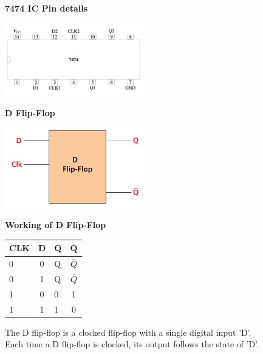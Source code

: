 \documentclass[10pt,a4paper]{report}
\begin{document}
\begin{multicols}{2}
   \vspace{2mm}\textbf{7474 IC Pin details}
 \begin{center}
 \includegraphics[width=0.45\textwidth]{ic.png} 
 \end{center}\vspace{5mm}
  \vspace{2mm}\textbf{D Flip-Flop}
 \begin{center}
 \includegraphics[width=0.45\textwidth]{dff.jpg} 
 \end{center}\vspace{1cm}
 \textbf{Working of D Flip-Flop}

  \setlength{\arrayrulewidth}{0.5mm} \begin{center}
      

  \setlength{\tabcolsep}{25pt}
  \renewcommand{\arraystretch}{1.3}
  \begin{tabular}{|l|c|l|c|}
  \hline 
  \textbf{CLK} & \textbf{D} & \textbf{Q}  & \textbf{$\overline{\textbf{Q}}$}\\
  \hline
    0 & 0 & Q & $\overline{Q}$\\
    0 & 1 & Q & $\overline{Q}$ \\
    1 & 0 & 0 & 1\\
    1 & 1 & 1 & 0\\
    \hline
      \end{tabular}
  \end{center} \vspace{2mm}
  
The D flip-flop is a clocked flip-flop with a single digital input 'D'. \\ Each time a D flip-flop is clocked, its output follows the state of 'D'.\\
\vspace{1cm}




\end{multicols}
\end{document}
